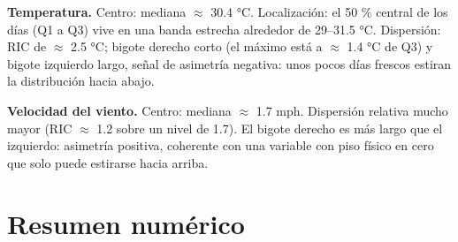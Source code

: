 \documentclass[oneside, openany, fontset=libertinus]{mitthesis}
\begin{document}
\textbf{Temperatura.} Centro: mediana \(\approx\) 30.4 °C. Localización:
el 50 \% central de los días (Q1 a Q3) vive en una banda estrecha
alrededor de 29--31.5 °C. Dispersión: RIC de \(\approx\) 2.5 °C; bigote
derecho corto (el máximo está a \(\approx\) 1.4 °C de Q3) y bigote
izquierdo largo, señal de asimetría negativa: unos pocos días frescos
estiran la distribución hacia abajo.

\textbf{Velocidad del viento.} Centro: mediana \(\approx\) 1.7 mph.
Dispersión relativa mucho mayor (RIC \(\approx\) 1.2 sobre un nivel de
1.7). El bigote derecho es más largo que el izquierdo: asimetría
positiva, coherente con una variable con piso físico en cero que solo
puede estirarse hacia arriba.

\chapter{Resumen numérico}\label{p5}
\end{document}
